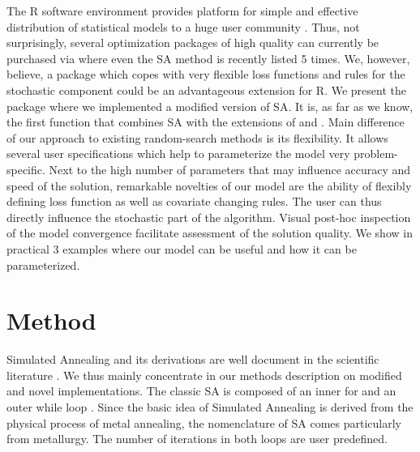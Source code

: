 The R software environment provides platform for simple and effective distribution of statistical models to a huge user community \citep{xiang_2013}. Thus, not surprisingly, several optimization packages of high quality can currently be purchased via  \citep{theussl_2016} where even the SA method is recently listed 5 times. We, however, believe, a package which copes with very flexible loss functions and rules for the stochastic component could be an advantageous extension for R. We present the package  where we implemented a modified version of SA. It is, as far as we know, the first function that combines SA with the extensions of \citet{corana_1987} and \citet{pronzato_1984}. Main difference of our approach to existing random-search methods is its flexibility. It allows several user specifications which help to parameterize the model very problem-specific. Next to the high number of parameters that may influence accuracy and speed of the solution, remarkable novelties of our model are the ability of flexibly defining loss function as well as covariate changing rules. The user can thus directly influence the stochastic part of the algorithm. Visual post-hoc inspection of the model convergence facilitate assessment of the solution quality. We show in practical 3 examples where our model can be useful and how it can be parameterized.

\section{Method}
Simulated Annealing and its derivations are well document in the scientific literature \citep[e. g. in][]{hansen_2012,kirkpatrick_1983, xiang_2013}. We thus mainly concentrate in our methods description on modified and novel implementations. The classic SA is composed of an inner for and an outer while loop \citep{kirkpatrick_1983}. Since the basic idea of Simulated Annealing is derived from the physical process of metal annealing, the nomenclature of SA comes particularly from metallurgy. The number of iterations in both loops are user predefined.

